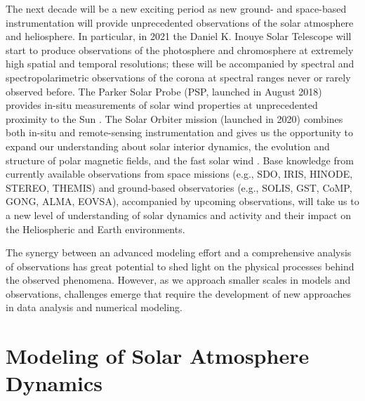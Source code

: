 \documentclass[]{article}
\newcommand{\SC}{\bf \color{red}}
\begin{document}
The next decade will be a new exciting period as new ground- and space-based instrumentation will provide unprecedented observations of the solar atmosphere and heliosphere. In particular, in 2021 the Daniel K. Inouye Solar Telescope {\citep[DKIST, ][]{rimmele2020}} will start to produce observations of the photosphere and chromosphere at extremely high spatial and temporal resolutions; these will be accompanied by spectral and spectropolarimetric observations of the corona at spectral ranges never or rarely observed before. The Parker Solar Probe (PSP, launched in August 2018) provides in-situ measurements of solar wind properties at unprecedented proximity to the Sun \citep{Fox2016}. The Solar Orbiter mission (launched in 2020) combines both in-situ and remote-sensing instrumentation and gives us the opportunity to expand our understanding about solar interior dynamics, the evolution and structure of polar magnetic fields, and the fast solar wind \citep{Muller2020}. Base knowledge from currently available observations from space missions (e.g., SDO, IRIS, HINODE, STEREO, THEMIS) and ground-based observatories (e.g., SOLIS, GST, CoMP, GONG, ALMA, EOVSA), accompanied by upcoming observations, will take us to a new level of understanding of solar dynamics and activity and their impact on the Heliospheric and Earth environments.

The synergy between an advanced modeling effort and a comprehensive analysis of observations has great potential to shed light on the physical processes behind the observed phenomena. However, as we approach smaller scales in models and observations, challenges emerge that require the development of new approaches in data analysis and numerical modeling. 

\section{Modeling of Solar Atmosphere Dynamics}
\end{document}
